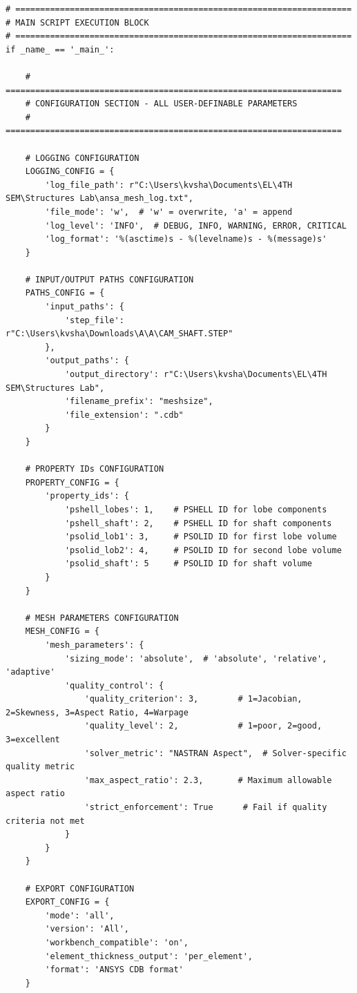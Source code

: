 \documentclass{book}
\begin{document}
\begin{itemize}[leftmargin=*,label=\textbullet]
\begin{itemize}
\begin{lstlisting}[caption={Phase 1 Meshing Automation Script},label={lst:phase1}]
# ====================================================================
# MAIN SCRIPT EXECUTION BLOCK
# ====================================================================
if _name_ == '_main_':
    
    # ====================================================================
    # CONFIGURATION SECTION - ALL USER-DEFINABLE PARAMETERS
    # ====================================================================
    
    # LOGGING CONFIGURATION
    LOGGING_CONFIG = {
        'log_file_path': r"C:\Users\kvsha\Documents\EL\4TH SEM\Structures Lab\ansa_mesh_log.txt",
        'file_mode': 'w',  # 'w' = overwrite, 'a' = append
        'log_level': 'INFO',  # DEBUG, INFO, WARNING, ERROR, CRITICAL
        'log_format': '%(asctime)s - %(levelname)s - %(message)s'
    }
    
    # INPUT/OUTPUT PATHS CONFIGURATION
    PATHS_CONFIG = {
        'input_paths': {
            'step_file': r"C:\Users\kvsha\Downloads\A\A\CAM_SHAFT.STEP"
        },
        'output_paths': {
            'output_directory': r"C:\Users\kvsha\Documents\EL\4TH SEM\Structures Lab",
            'filename_prefix': "meshsize",
            'file_extension': ".cdb"
        }
    }
    
    # PROPERTY IDs CONFIGURATION
    PROPERTY_CONFIG = {
        'property_ids': {
            'pshell_lobes': 1,    # PSHELL ID for lobe components
            'pshell_shaft': 2,    # PSHELL ID for shaft components
            'psolid_lob1': 3,     # PSOLID ID for first lobe volume
            'psolid_lob2': 4,     # PSOLID ID for second lobe volume
            'psolid_shaft': 5     # PSOLID ID for shaft volume
        }
    }
    
    # MESH PARAMETERS CONFIGURATION
    MESH_CONFIG = {
        'mesh_parameters': {
            'sizing_mode': 'absolute',  # 'absolute', 'relative', 'adaptive'
            'quality_control': {
                'quality_criterion': 3,        # 1=Jacobian, 2=Skewness, 3=Aspect Ratio, 4=Warpage
                'quality_level': 2,            # 1=poor, 2=good, 3=excellent
                'solver_metric': "NASTRAN Aspect",  # Solver-specific quality metric
                'max_aspect_ratio': 2.3,       # Maximum allowable aspect ratio
                'strict_enforcement': True      # Fail if quality criteria not met
            }
        }
    }
    
    # EXPORT CONFIGURATION
    EXPORT_CONFIG = {
        'mode': 'all',
        'version': 'All',
        'workbench_compatible': 'on',
        'element_thickness_output': 'per_element',
        'format': 'ANSYS CDB format'
    }
    

\end{lstlisting}
\end{itemize}
\end{itemize}
\end{document}
